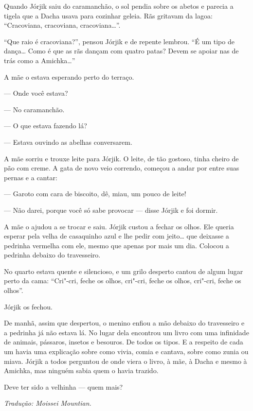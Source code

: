 Quando Jórjik saiu do caramanchão, o sol pendia sobre os abetos e
parecia a tigela que a Dacha usava para cozinhar geleia. Rãs gritavam da
lagoa: ``Cracoviana, cracoviana, cracoviana\ldots{}''.

``Que raio é cracoviana?'', pensou Jórjik e de repente lembrou. ``É um tipo de dança\ldots{} Como é que as rãs dançam com quatro patas? Devem se
apoiar nas de trás como a Amichka\ldots{}''

A mãe o estava esperando perto do terraço.

--- Onde você estava?

--- No caramanchão.

--- O que estava fazendo lá?

--- Estava ouvindo as abelhas conversarem.

A mãe sorriu e trouxe leite para Jórjik. O leite, de tão gostoso, tinha
cheiro de pão com creme. A gata de novo veio correndo, começou a andar
por entre suas pernas e a cantar:

--- Garoto com cara de biscoito, dê, miau, um pouco de leite!

--- Não darei, porque você só sabe provocar --- disse Jórjik e foi
dormir.

A mãe o ajudou a se trocar e saiu. Jórjik custou a fechar os olhos. Ele
queria esperar pela velha de casaquinho azul e lhe pedir com jeito\ldots{}
que deixasse a pedrinha vermelha com ele, mesmo que apenas por mais um
dia. Colocou a pedrinha debaixo do travesseiro.

No quarto estava quente e silencioso, e um grilo desperto cantou de
algum lugar perto da cama: ``Cri"-cri, feche os olhos, cri"-cri, feche os
olhos, cri"-cri, feche os olhos''.

Jórjik os fechou.

De manhã, assim que despertou, o menino enfiou a mão debaixo do
travesseiro e a pedrinha já não estava lá. No lugar dela encontrou um
livro com uma infinidade de animais, pássaros, insetos e besouros. De
todos os tipos. E a respeito de cada um havia uma explicação sobre como
vivia, comia e cantava, sobre como zunia ou miava. Jórjik a todos
perguntou de onde viera o livro, à mãe, à Dacha e mesmo à Amichka, mas
ninguém sabia quem o havia trazido.

Deve ter sido a velhinha --- quem mais? \enlargethispage{\baselineskip}


{\footnotesize\hfill\emph{Tradução: Moissei Mountian.}}

